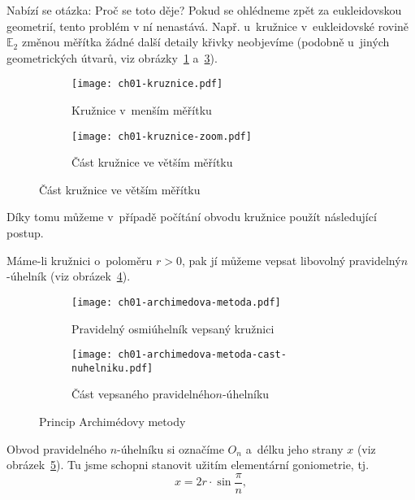 Nabízí se otázka: Proč se toto děje? Pokud se ohlédneme zpět za eukleidovskou geometrií, tento problém v ní nenastává. Např. u~kružnice v~eukleidovské rovině $\mathbb{E}_2$ změnou měřítka žádné další detaily křivky neobjevíme (podobně u~jiných geometrických útvarů, viz obrázky~\ref{subfig:kruznice} a~\ref{subfig:kruznice_zoom}). 
\begin{figure}[h]
    \centering
    \begin{subfigure}{\subfigwidth}
        \centering
        \texttt{[image: ch01-kruznice.pdf]}
        \caption{Kružnice v~menším měřítku}
        \label{subfig:kruznice}
    \end{subfigure}
    \quad
    \begin{subfigure}{\subfigwidth}
        \centering
        \texttt{[image: ch01-kruznice-zoom.pdf]}
        \caption{Část kružnice ve větším měřítku}
        \label{subfig:kruznice_zoom}
    \end{subfigure}
\end{figure}
Díky tomu můžeme v~případě počítání obvodu kružnice použít následující postup.\par
Máme-li kružnici o~poloměru $r>0$, pak jí můžeme vepsat libovolný pravidelný\linebreak $n$-úhelník (viz obrázek~\ref{subfig:archimedova_metoda}).
\begin{figure}[h]
    \centering
    \begin{subfigure}{\subfigwidth}
        \centering
        \texttt{[image: ch01-archimedova-metoda.pdf]}
        \caption{Pravidelný osmiúhelník vepsaný kružnici}
        \label{subfig:archimedova_metoda}
    \end{subfigure}
    \quad
    \begin{subfigure}{\subfigwidth}
        \centering
        \texttt{[image: ch01-archimedova-metoda-cast-nuhelniku.pdf]}
        \caption{Část vepsaného pravidelného\linebreak $n$-úhelníku}
        \label{subfig:archimedova_metoda_cast_nuhelniku}
    \end{subfigure}
    \caption{Princip Archimédovy metody}
    \label{fig:princip_archimedovy_metody}
\end{figure}
Obvod pravidelného $n$-úhelníku si označíme $O_n$ a~délku jeho strany $x$ (viz obrázek~\ref{subfig:archimedova_metoda_cast_nuhelniku}). Tu jsme schopni stanovit užitím elementární goniometrie, tj.
\begin{equation*}
    x=2r\cdot\sin{\dfrac{\pi}{n}},
\end{equation*}
